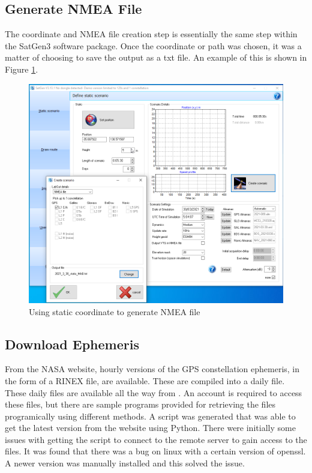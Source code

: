 \subsection{Generate NMEA File}
The coordinate and NMEA file creation step is essentially the same step within the SatGen3 software package. Once the coordinate or path was chosen, it was a matter of
choosing to save the output as a txt file. An example of this is shown in Figure \ref{fig:StaticCoordinateNMEA}.

\begin{figure}[ht]
    \begin{centering}
        \includegraphics[width=12cm,keepaspectratio]{Figures/2021_03_30_static_MAB_setup.png}
        \caption{Using static coordinate to generate NMEA file}
    \label{fig:StaticCoordinateNMEA}
    \end{centering}
\end{figure}

\subsection{Download Ephemeris}
From the NASA website, hourly versions of the GPS constellation ephemeris, in the form of a RINEX file, are available. These are compiled into a daily file. These daily
files are available all the way from . An account is required to access these files, but there are sample programs provided for retrieving
the files programically using different methods. A script was generated that was able to get the latest version from the website using Python. There were initially some
issues with getting the script to connect to the remote server to gain access to the files. It was found that there was a bug on linux with a certain version of openssl.
A newer version was manually installed and this solved the issue.

